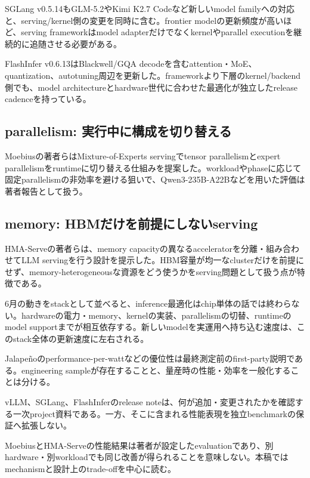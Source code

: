 SGLang v0.5.14もGLM-5.2やKimi K2.7 Codeなど新しいmodel familyへの対応と、serving/kernel側の変更を同時に含む。frontier modelの更新頻度が高いほど、serving frameworkはmodel adapterだけでなくkernelやparallel executionを継続的に追随させる必要がある。\autocite{src-538cecdad845}


FlashInfer v0.6.13はBlackwell/GQA decodeを含むattention・MoE、quantization、autotuning周辺を更新した。frameworkより下層のkernel/backend側でも、model architectureとhardware世代に合わせた最適化が独立したrelease cadenceを持っている。\autocite{src-272a6dac5bcc}


\subsection{parallelism: 実行中に構成を切り替える}

Moebiusの著者らはMixture-of-Experts servingでtensor parallelismとexpert parallelismをruntimeに切り替える仕組みを提案した。workloadやphaseに応じて固定parallelismの非効率を避ける狙いで、Qwen3-235B-A22Bなどを用いた評価は著者報告として扱う。\autocite{src-43606e2afafd}


\subsection{memory: HBMだけを前提にしないserving}

HMA-Serveの著者らは、memory capacityの異なるacceleratorを分離・組み合わせてLLM servingを行う設計を提示した。HBM容量が均一なclusterだけを前提にせず、memory-heterogeneousな資源をどう使うかをserving問題として扱う点が特徴である。\autocite{src-a66d76643eee}


6月の動きをstackとして並べると、inference最適化はchip単体の話では終わらない。hardwareの電力・memory、kernelの実装、parallelismの切替、runtimeのmodel supportまでが相互依存する。新しいmodelを実運用へ持ち込む速度は、このstack全体の更新速度に左右される。\autocite{src-272a6dac5bcc,src-43606e2afafd,src-538cecdad845,src-6cc910fb0183,src-855db08b75f6,src-a66d76643eee}


\begin{claimboundary}
Jalapeñoのperformance-per-wattなどの優位性は最終測定前のfirst-party説明である。engineering sampleが存在することと、量産時の性能・効率を一般化することは分ける。\autocite{src-855db08b75f6}
\end{claimboundary}

\begin{claimboundary}
vLLM、SGLang、FlashInferのrelease noteは、何が追加・変更されたかを確認する一次project資料である。一方、そこに含まれる性能表現を独立benchmarkの保証へ拡張しない。\autocite{src-272a6dac5bcc,src-538cecdad845,src-6cc910fb0183}
\end{claimboundary}

\begin{claimboundary}
MoebiusとHMA-Serveの性能結果は著者が設定したevaluationであり、別hardware・別workloadでも同じ改善が得られることを意味しない。本稿ではmechanismと設計上のtrade-offを中心に読む。\autocite{src-43606e2afafd,src-a66d76643eee}
\end{claimboundary}
